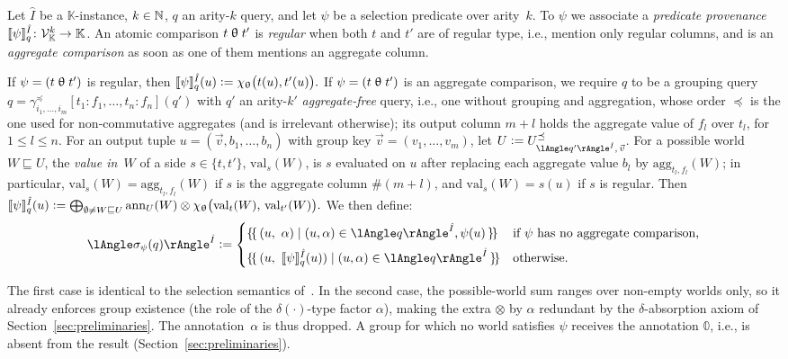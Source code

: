 \begin{definition}
\label{def:semantics}
Let $\hat I$ be a $\mathbb K$-instance, $k\in\mathbb{N}$, $q$ an arity-$k$
query, and let
$\psi$ be a selection predicate over arity~$k$. To $\psi$ we associate a
\emph{predicate provenance} $\llbracket \psi\rrbracket^{\hat I}_{q}\colon\mathcal V_{\mathbb K}^k\to\mathbb K$.
An atomic comparison $t\mathrel{\uptheta} t'$ is \emph{regular} when both $t$ and $t'$
are of regular type, i.e., mention only regular columns, and is an
\emph{aggregate comparison} as soon as one of them mentions an aggregate
column.

If $\psi=(t\mathrel{\uptheta} t')$ is regular, then
\(\llbracket \psi\rrbracket^{\hat I}_{q}(u)\mathrel{\mathop:}= \chi_{\mathrel{\uptheta}}\bigl(t(u),t'(u)\bigr).\)
If $\psi=(t\mathrel{\uptheta} t')$ is an aggregate comparison, we
require $q$ to be a grouping query
$q=\gamma^{\preceq}_{i_1,\dots,i_m}[t_1{:}f_1,\dots,t_n{:}f_n](q')$ with
$q'$ an arity-$k'$ \emph{aggregate-free} query, i.e., one without
grouping and aggregation, whose order $\preceq$ is the one used for non-commutative
aggregates (and is irrelevant otherwise); its output column $m+l$ holds
the aggregate value of $f_l$ over $t_l$, for $1\le l\le n$. For an output tuple
$u=(\vec v,b_1,\dots,b_n)$ with group key $\vec v=(v_1,\dots,v_m)$, let
$U\defeq U^{\preceq}_{\angsem{\hat I}{q'},\,\vec v}$. For a possible
world $W\sqsubseteq U$, the \emph{value in~$W$} of a side
$s\in\{t,t'\}$, $\mathrm{val}_s(W)$, is $s$ evaluated on $u$ after
replacing each aggregate value $b_l$ by $\mathrm{agg}_{t_l,f_l}(W)$; in
particular, $\mathrm{val}_s(W)=\mathrm{agg}_{t_l,f_l}(W)$ if $s$ is the
aggregate column $\#(m+l)$, and $\mathrm{val}_s(W)=s(u)$ if $s$ is
regular.
Then
\(
\llbracket \psi\rrbracket^{\hat I}_{q}(u)\mathrel{\mathop:}=
\bigoplus_{\emptyset\neq W\sqsubseteq U}
\mathrm{ann}_U(W)\otimes
\chi_{\mathrel{\uptheta}}\bigl(\mathrm{val}_t(W),\,\mathrm{val}_{t'}(W)\bigr).
\) We then define:
\[
\angsem{\hat I}{\sigma_\psi(q)}\defeq
\begin{cases}
\mset{(u,\ \alpha)\mid(u,\alpha)\in\angsem{\hat I}{q}, \psi(u)}
  & \text{if $\psi$ has no aggregate comparison,}\\[1ex]
\mset{(u,\ \predsem{\hat I}{q}{\psi}(u))\mid(u,\alpha)\in\angsem{\hat I}{q}}
  & \text{otherwise.}
\end{cases}
\]
\end{definition}
The first case is identical to the selection semantics
of~\cite{sen2026provsql}.
In the second case, the possible-world sum ranges over non-empty worlds only, so it
already enforces group existence (the role of the $\delta(\cdot)$-type
factor $\alpha$), making the extra $\otimes$ by $\alpha$ redundant by
the $\delta$-absorption axiom of Section~\ref{sec:preliminaries}. The
annotation~$\alpha$ is thus dropped. A
group for which no world satisfies $\psi$ receives the annotation
$\mathbb 0$, i.e., is absent from the result
(Section~\ref{sec:preliminaries}).

